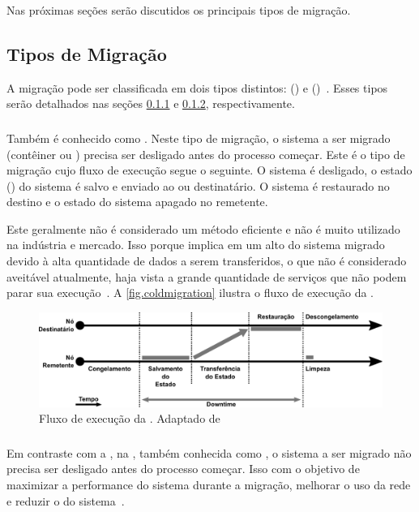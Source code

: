 Nas próximas seções serão discutidos os principais tipos de migração.

\subsection{Tipos de Migração}
A migração pode ser classificada em dois tipos distintos: \coldmigration(\nonlivemigration) e \hotmigration (\livemigration)~\cite{imran2022live}. Esses tipos serão detalhados nas seções \ref{sec.coldmigration} e \ref{sec.hotmigration}, respectivamente.

\subsubsection{\Coldmigration}\label{sec.coldmigration}
Também é conhecido como \nonlivemigration. Neste tipo de migração, o sistema a ser migrado (contêiner ou \vm) precisa ser desligado antes do processo começar. Este é o tipo de migração cujo fluxo de execução segue o seguinte. O sistema é desligado, o estado (\checkpoint) do sistema é salvo e enviado ao \so ou \vm destinatário. O sistema é restaurado no destino e o estado do sistema apagado no remetente.

Este geralmente não é considerado um método eficiente e não é muito utilizado na indústria e mercado. Isso porque implica em um alto \downtime do sistema migrado devido à alta quantidade de dados a serem transferidos, o que não é considerado aveitável atualmente, haja vista a grande quantidade de serviços que não podem parar sua execução~\cite{singh2022predictive, imran2022live}. A \autoref{fig.coldmigration} ilustra o fluxo de execução da \coldmigration.

\begin{figure}[bt]
    \centering
    \includegraphics[width=0.8\linewidth]{content/images/cold-migration-flow.pdf}
    \caption{Fluxo de execução da \coldmigration. Adaptado de~\cite{migrationimages}}
    \label{fig.coldmigration}
\end{figure}

\subsubsection{\Hotmigration}\label{sec.hotmigration}
Em contraste com a \coldmigration, na \hotmigration, também conhecida como \livemigration, o sistema a ser migrado não precisa ser desligado antes do processo começar. Isso com o objetivo de maximizar a performance do sistema durante a migração, melhorar o uso da rede e reduzir o \downtime do sistema~\cite{imran2022live}.


